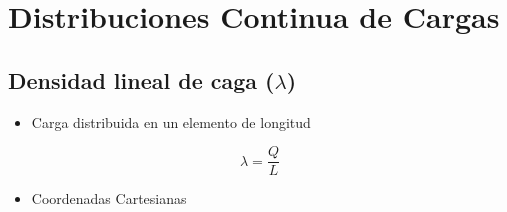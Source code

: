 \section{Distribuciones Continua de Cargas}
\subsection{Densidad lineal de caga ($\lambda$)}
\begin{itemize}
    \item Carga distribuida en un elemento de longitud
\end{itemize}
\begin{equation}
    \lambda = \frac{Q}{L}
\end{equation}
\begin{itemize}
    \item Coordenadas Cartesianas
\end{itemize}
